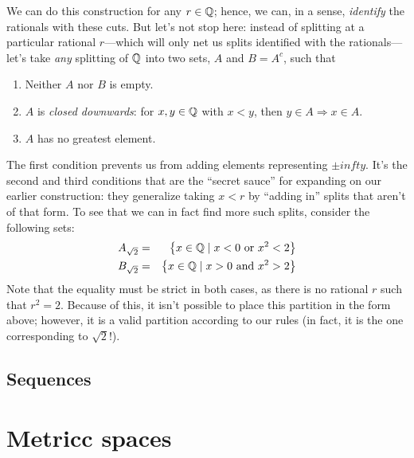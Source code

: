 We can do this construction for any $r \in \mathbb{Q}$; hence, we can, in a sense, \emph{identify} the rationals with these cuts. But let's not stop here: instead of splitting at a particular rational $r$---which will only net us splits identified with the rationals---let's take \emph{any} splitting of $\mathbb{Q}$ into two sets, $A$ and $B = A^c$, such that
\begin{enumerate}
    \item Neither $A$ nor $B$ is empty.
    \item $A$ is \emph{closed downwards}: for $x,y \in \mathbb{Q}$ with $x < y$, then $y \in A \Rightarrow x \in A$.
    \item $A$ has no greatest element.
\end{enumerate}

The first condition prevents us from adding elements representing $\pm infty$. It's the second and third conditions that are the ``secret sauce'' for expanding on our earlier construction: they generalize taking $x < r$ by ``adding in'' splits that aren't of that form. To see that we can in fact find more such splits, consider the following sets:
\begin{eqnarray}
    A_{\sqrt{2}} & = & \left\{ x \in \mathbb{Q} \mid x < 0 \textrm{ or } x^2 < 2  \right\} \\
    B_{\sqrt{2}} & = & \left\{ x \in \mathbb{Q} \mid x > 0 \textrm{ and } x^2 > 2  \right\}
\end{eqnarray}
Note that the equality must be strict in both cases, as there is no rational $r$ such that $r^2 = 2$. Because of this, it isn't possible to place this partition in the form above; however, it is a valid partition according to our rules (in fact, it is the one corresponding to $\sqrt{2}$!).

\subsection{Sequences}



\section{Metricc spaces}


